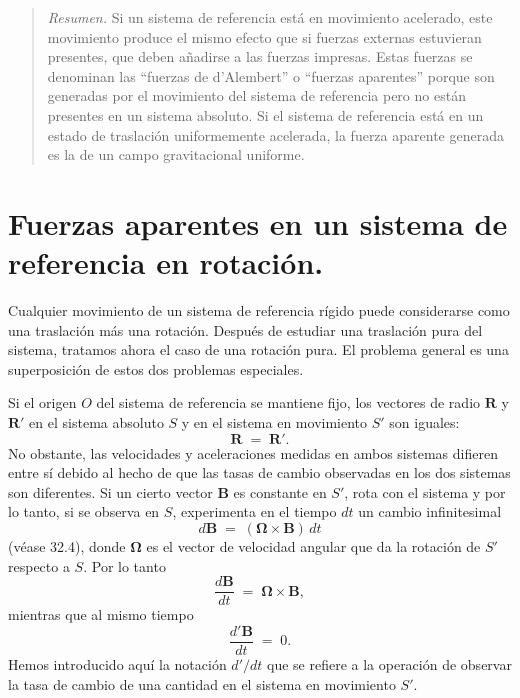\documentclass[12pt,a4paper]{book}
\begin{document}
\begin{quote}
\textit{Resumen.} Si un sistema de referencia está en movimiento acelerado, este movimiento produce el mismo efecto que si fuerzas externas estuvieran presentes, que deben añadirse a las fuerzas impresas. Estas fuerzas se denominan las ``fuerzas de d'Alembert'' o ``fuerzas aparentes'' porque son generadas por el movimiento del sistema de referencia pero no están presentes en un sistema absoluto. Si el sistema de referencia está en un estado de traslación uniformemente acelerada, la fuerza aparente generada es la de un campo gravitacional uniforme.
\end{quote}

\section{Fuerzas aparentes en un sistema de referencia en rotación.}

Cualquier movimiento de un sistema de referencia rígido puede considerarse como una traslación más una rotación. Después de estudiar una traslación pura del sistema, tratamos ahora el caso de una rotación pura. El problema general es una superposición de estos dos problemas especiales.

Si el origen $O$ del sistema de referencia se mantiene fijo, los vectores de radio $\mathbf{R}$ y $\mathbf{R}'$ en el sistema absoluto $S$ y en el sistema en movimiento $S'$ son iguales:
\begin{equation}
\mathbf{R} \;=\; \mathbf{R}'. \tag{45.1}
\end{equation}
No obstante, las velocidades y aceleraciones medidas en ambos sistemas difieren entre sí debido al hecho de que las tasas de cambio observadas en los dos sistemas son diferentes. Si un cierto vector $\mathbf{B}$ es constante en $S'$, rota con el sistema y por lo tanto, si se observa en $S$, experimenta en el tiempo $dt$ un cambio infinitesimal
\begin{equation}
d\mathbf{B} \;=\; (\mathbf{\Omega} \times \mathbf{B})\,dt \tag{45.2}
\end{equation}
(véase 32.4), donde $\mathbf{\Omega}$ es el vector de velocidad angular que da la rotación de $S'$ respecto a $S$. Por lo tanto
\begin{equation}
\frac{d\mathbf{B}}{dt} \;=\; \mathbf{\Omega} \times \mathbf{B}, \tag{45.3}
\end{equation}
mientras que al mismo tiempo
\begin{equation}
\frac{d'\mathbf{B}}{dt} \;=\; 0. \tag{45.4}
\end{equation}
Hemos introducido aquí la notación $d'/dt$ que se refiere a la operación de observar la tasa de cambio de una cantidad en el sistema en movimiento $S'$.
\end{document}
